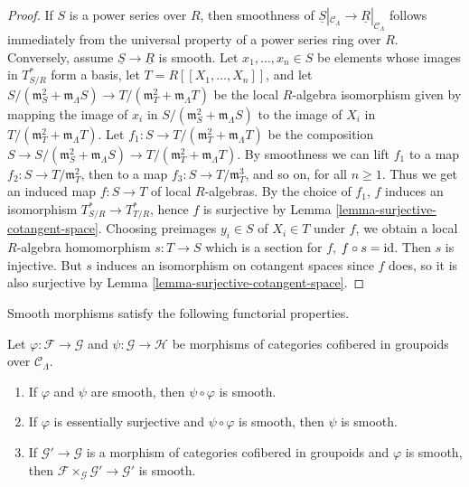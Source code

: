 \begin{proof}
If $S$ is a power series over $R$, then smoothness of $\underline{S}|_{\mathcal 
C_{\Lambda}} \rightarrow \underline{R}|_{\mathcal C_{\Lambda}}$ follows 
immediately from the universal property of a power series ring over $R$.  
Conversely, assume $\underline{S} \rightarrow \underline{R}$ is smooth.  Let 
$x_1, \dots, x_n \in S$ be elements whose images in $T^*_{S/R}$ form a basis, 
let $T = R[[X_1, \dots, X_n]]$, and let $S/(\mathfrak{m}_S^2 + 
\mathfrak{m}_{\Lambda}S) \rightarrow T/(\mathfrak{m}_T^2 + 
\mathfrak{m}_{\Lambda}T)$ be the local $R$-algebra isomorphism given by mapping 
the image of $x_i$ in $S/(\mathfrak{m}_S^2 + \mathfrak{m}_{\Lambda}S)$ to the 
image of $X_i$ in $T/(\mathfrak{m}_T^2 + \mathfrak{m}_{\Lambda}T)$.  Let $f_1: 
S \rightarrow T/(\mathfrak{m}_T^2 + \mathfrak{m}_{\Lambda}T)$ be the 
composition $S \rightarrow S/(\mathfrak{m}_S^2 + \mathfrak{m}_{\Lambda}S) 
\rightarrow T/(\mathfrak{m}_T^2 + \mathfrak{m}_{\Lambda}T)$.  By smoothness we 
can lift $f_1$ to a map $f_2: S \rightarrow T/\mathfrak{m}_T^2$, then to a map 
$f_3: S \rightarrow T/\mathfrak{m}_T^3$, and so on, for all $n \geq 1$.  Thus 
we get an induced map $f: S \rightarrow T$ of local $R$-algebras.  By the 
choice of $f_1$, $f$ induces an isomorphism $T^*_{S/R} \rightarrow T^*_{T/R}$, 
hence $f$ is surjective by Lemma \ref{lemma-surjective-cotangent-space}.  
Choosing preimages $y_i \in S$ of $X_i \in T$ under $f$, we obtain a local 
$R$-algebra homomorphism $s: T \rightarrow S$ which is a section for $f$, $f 
\circ s = \textnormal{id}$. Then $s$ is injective. But $s$ induces an 
isomorphism on cotangent spaces since $f$ does, so it is also surjective by 
Lemma \ref{lemma-surjective-cotangent-space}. 
\end{proof}

\noindent Smooth morphisms satisfy the following functorial properties.
\begin{lemma}
\label{lemma-smooth-properties}
Let $\varphi: \mathcal F \rightarrow \mathcal G$ and $\psi: \mathcal G 
\rightarrow \mathcal H$ be morphisms of categories cofibered in groupoids over 
$\mathcal C_{\Lambda}$.
\begin{enumerate}
\item If $\varphi$ and $\psi$ are smooth, then $\psi \circ \varphi$ is smooth.
\item If $\varphi$ is essentially surjective and $\psi \circ \varphi$ is 
smooth, then $\psi$ is smooth.
\item If $\mathcal G' \rightarrow \mathcal G$ is a morphism of categories 
cofibered in groupoids and $\varphi$ is smooth, then $\mathcal F 
\times_{\mathcal G} \mathcal G' \rightarrow \mathcal G'$ is smooth.
\end{enumerate}
\end{lemma} 

